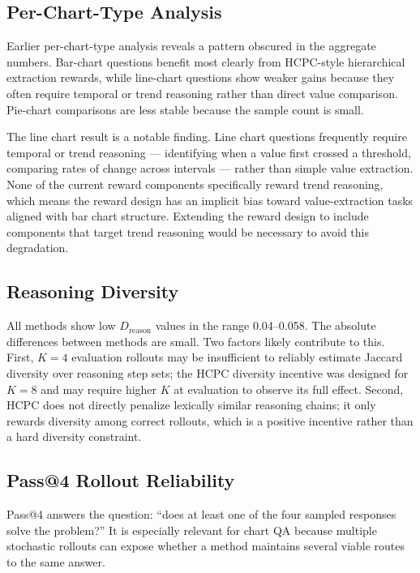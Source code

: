 \documentclass{iutbscthesis}
\begin{document}
\subsection{Per-Chart-Type Analysis}

Earlier per-chart-type analysis reveals a pattern obscured in the aggregate numbers. Bar-chart questions benefit most clearly from HCPC-style hierarchical extraction rewards, while line-chart questions show weaker gains because they often require temporal or trend reasoning rather than direct value comparison. Pie-chart comparisons are less stable because the sample count is small.

The line chart result is a notable finding. Line chart questions frequently require temporal or trend reasoning --- identifying when a value first crossed a threshold, comparing rates of change across intervals --- rather than simple value extraction. None of the current reward components specifically reward trend reasoning, which means the reward design has an implicit bias toward value-extraction tasks aligned with bar chart structure. Extending the reward design to include components that target trend reasoning would be necessary to avoid this degradation.

\subsection{Reasoning Diversity}

All methods show low $D_{\text{reason}}$ values in the range 0.04--0.058. The absolute differences between methods are small. Two factors likely contribute to this. First, $K=4$ evaluation rollouts may be insufficient to reliably estimate Jaccard diversity over reasoning step sets; the HCPC diversity incentive was designed for $K=8$ and may require higher $K$ at evaluation to observe its full effect. Second, HCPC does not directly penalize lexically similar reasoning chains; it only rewards diversity among correct rollouts, which is a positive incentive rather than a hard diversity constraint.

\subsection{Pass@4 Rollout Reliability}

Pass@4 answers the question: ``does at least one of the four sampled responses solve the problem?'' It is especially relevant for chart QA because multiple stochastic rollouts can expose whether a method maintains several viable routes to the same answer.
\end{document}
